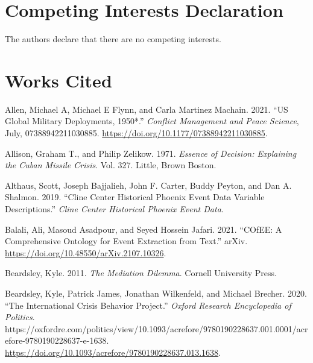 \documentclass{article}
\newlength{\cslhangindent}
\newlength{\cslentryspacingunit} %
\newenvironment{CSLReferences}[2] %
 {%
  \setlength{\parindent}{0pt}
  \ifodd #1
  \let\oldpar\par
  \def\par{\hangindent=\cslhangindent\oldpar}
  \fi
  \setlength{\parskip}{#2\cslentryspacingunit}
 }%
 {}
\begin{document}
\hypertarget{competing-interests-declaration}{%
\section{Competing Interests
Declaration}\label{competing-interests-declaration}}

The authors declare that there are no competing interests.

\clearpage

\hypertarget{works-cited}{%
\section*{Works Cited}\label{works-cited}}

\hypertarget{refs}{}
\begin{CSLReferences}{1}{0}
\leavevmode{}%
Allen, Michael A, Michael E Flynn, and Carla Martinez Machain. 2021.
{``{US} Global Military Deployments, 1950*.''}
\emph{Conflict Management and Peace Science}, July, 07388942211030885.
\url{https://doi.org/10.1177/07388942211030885}.

\leavevmode{}%
Allison, Graham T., and Philip Zelikow. 1971. \emph{Essence of Decision:
{Explaining} the {Cuban} Missile Crisis}. Vol. 327. {Little, Brown
Boston}.

\leavevmode{}%
Althaus, Scott, Joseph Bajjalieh, John F. Carter, Buddy Peyton, and Dan
A. Shalmon. 2019. {``Cline {Center Historical Phoenix Event Data
Variable Descriptions}.''} \emph{Cline Center Historical Phoenix Event
Data}.

\leavevmode{}%
Balali, Ali, Masoud Asadpour, and Seyed Hossein Jafari. 2021.
{``{COfEE}: {A Comprehensive Ontology} for {Event Extraction} from
Text.''} {arXiv}. \url{https://doi.org/10.48550/arXiv.2107.10326}.

\leavevmode{}%
Beardsley, Kyle. 2011. \emph{The Mediation Dilemma}. {Cornell University
Press}.

\leavevmode{}%
Beardsley, Kyle, Patrick James, Jonathan Wilkenfeld, and Michael
Brecher. 2020. {``The {International Crisis Behavior Project}.''}
\emph{Oxford Research Encyclopedia of Politics}.
https://oxfordre.com/politics/view/10.1093/acrefore/9780190228637.001.0001/acrefore-9780190228637-e-1638.
\url{https://doi.org/10.1093/acrefore/9780190228637.013.1638}.


\end{CSLReferences}
\end{document}
